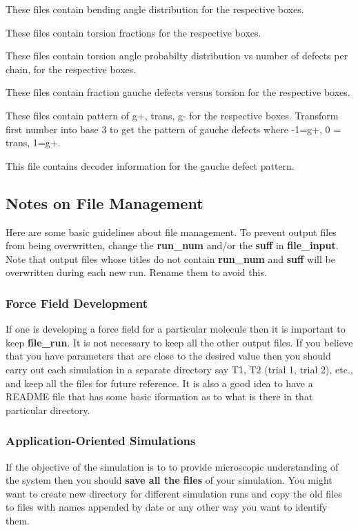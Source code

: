 \documentclass[12pt,letterpaper]{article}
\begin{document}
 These files contain bending angle
distribution for the respective boxes.

 These files contain torsion fractions
for the respective boxes.

 These files contain torsion angle
probabilty distribution vs number of defects per chain, for
the respective boxes.

 These files contain fraction gauche
defects versus torsion for the respective boxes.

These files contain pattern of g+, trans, g- for the
respective boxes. Transform first number into base 3 to get
the pattern of gauche defects where -1=g+, 0 = trans, 1=g+.

 This file contains decoder
information for the gauche defect pattern.

\subsection{Notes on File Management}
\noindent Here are some basic guidelines about file
management. To prevent output files from being overwritten,
change the {\bf run\_num} and/or the {\bf suff} in {\bf
  file\_input}. Note that output files whose titles do not
contain {\bf run\_num} and {\bf suff} will be overwritten
during each new run. Rename them to avoid this.

\subsubsection{Force Field Development} If one is developing a force
field for a particular molecule then it is important to keep
{\bf file\_run}. It is not necessary to keep all the other
output files. If you believe that you have parameters that
are close to the desired value then you should carry out
each simulation in a separate directory say T1, T2 (trial 1,
trial 2), etc., and keep all the files for future reference.
It is also a good idea to have a README file that has some
basic iformation as to what is there in that particular
directory.

\subsubsection{Application-Oriented Simulations} If the objective of
the simulation is to to provide microscopic understanding of
the system then you should {\bf save all the files} of your
simulation. You might want to create new directory for
different simulation runs and copy the old files to files
with names appended by date or any other way you want to
identify them.
\end{document}
